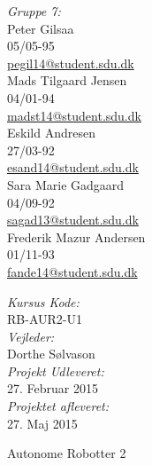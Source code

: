 \begin{titlepage}
\begin{center}
\begin{minipage}{0.50\textwidth}
\begin{flushleft}\large
\emph{Gruppe 7:}\\
\vspace{4mm}
Peter Gilsaa \\
05/05-95 \\
\href{mailto:pegil14@student.sdu.dk}{\color{sdu_blue}pegil14@student.sdu.dk}\\
\vspace{4mm}
Mads Tilgaard Jensen\\
04/01-94 \\
\href{mailto:madst14@student.sdu.dk}{\color{sdu_blue}madst14@student.sdu.dk}\\
\vspace{4mm}
Eskild Andresen\\
27/03-92 \\
\href{mailto:esand14@student.sdu.dk}{\color{sdu_blue}esand14@student.sdu.dk}\\
\vspace{4mm}
Sara Marie Gadgaard\\
04/09-92 \\
\href{mailto:sagad13@student.sdu.dk}{\color{sdu_blue}sagad13@student.sdu.dk}\\
\vspace{4mm}
Frederik Mazur Andersen\\
01/11-93 \\
\href{mailto:fande14@student.sdu.dk}{\color{sdu_blue}fande14@student.sdu.dk}\\
\end{flushleft}
\end{minipage}
\begin{minipage}[c][2cm]{0.45\textwidth}
\begin{flushright} \large
\vspace{2cm}
\emph{Kursus Kode:} \\
RB-AUR2-U1 \\
\vspace{2cm}
\emph{Vejleder:} \\
Dorthe Sølvason  \\
\vspace{2cm}
\emph{Projekt Udleveret:} \\
27. Februar 2015 \\
\vspace{4mm}
\emph{Projektet afleveret:} \\
27. Maj 2015
\end{flushright}
\end{minipage}

\vfill

{\Large Autonome Robotter 2}
\end{center}
\end{titlepage}
